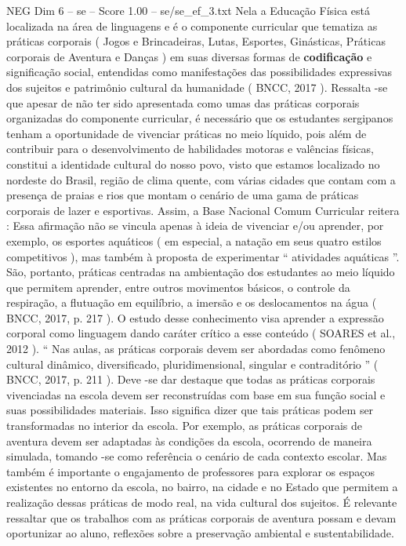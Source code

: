 \begin{textsample}{NEG Dim 6 – se – Score 1.00 – se/se\_ef\_3.txt}
Nela a Educação Física está localizada na área de linguagens e é o componente curricular que tematiza as práticas corporais ( Jogos e Brincadeiras, Lutas, Esportes, Ginásticas, Práticas corporais de Aventura e Danças ) em suas diversas formas de \textbf{codificação} e significação social, entendidas como manifestações das possibilidades expressivas dos sujeitos e patrimônio cultural da humanidade ( BNCC, 2017 ).
Ressalta -se que apesar de não ter sido apresentada como umas das práticas corporais organizadas do componente curricular, é necessário que os estudantes sergipanos tenham a oportunidade de vivenciar práticas no meio líquido, pois além de contribuir para o desenvolvimento de habilidades motoras e valências físicas, constitui a identidade cultural do nosso povo, visto que estamos localizado no nordeste do Brasil, região de clima quente, com várias cidades que contam com a presença de praias e rios que montam o cenário de uma gama de práticas corporais de lazer e esportivas.
Assim, a Base Nacional Comum Curricular reitera : Essa afirmação não se vincula apenas à ideia de vivenciar e/ou aprender, por exemplo, os esportes aquáticos ( em especial, a natação em seus quatro estilos competitivos ), mas também à proposta de experimentar “ atividades aquáticas ”.
São, portanto, práticas centradas na ambientação dos estudantes ao meio líquido que permitem aprender, entre outros movimentos básicos, o controle da respiração, a flutuação em equilíbrio, a imersão e os deslocamentos na água ( BNCC, 2017, p. 217 ).
O estudo desse conhecimento visa aprender a expressão corporal como linguagem dando caráter crítico a esse conteúdo ( SOARES et al., 2012 ). “ Nas aulas, as práticas corporais devem ser abordadas como fenômeno cultural dinâmico, diversificado, pluridimensional, singular e contraditório ” ( BNCC, 2017, p. 211 ).
Deve -se dar destaque que todas as práticas corporais vivenciadas na escola devem ser reconstruídas com base em sua função social e suas possibilidades materiais.
Isso significa dizer que tais práticas podem ser transformadas no interior da escola.
Por exemplo, as práticas corporais de aventura devem ser adaptadas às condições da escola, ocorrendo de maneira simulada, tomando -se como referência o cenário de cada contexto escolar.
Mas também é importante o engajamento de professores para explorar os espaços existentes no entorno da escola, no bairro, na cidade e no Estado que permitem a realização dessas práticas de modo real, na vida cultural dos sujeitos.
É relevante ressaltar que os trabalhos com as práticas corporais de aventura possam e devam oportunizar ao aluno, reflexões sobre a preservação ambiental e sustentabilidade.

\end{textsample}
